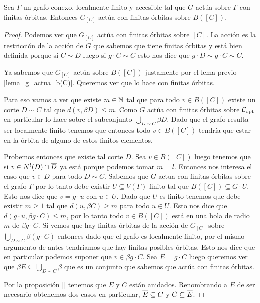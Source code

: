 \documentclass[tesis.tex]{subfiles}
\begin{document}
\begin{lema}
	Sea $\Gamma$ un grafo conexo, localmente finito y accesible tal que $G$ actúa sobre $\Gamma$ con finitas órbitas.
	Entonces $G_{[C]}$ actúa con finitas órbitas sobre $B([C])$.
\end{lema}
\begin{proof}
	Podemos ver que $G_{[C]}$ actúa con finitas órbitas sobre $[C]$.
	La acción es la restricción de la acción de $G$ que sabemos que tiene finitas órbitas y está bien definida porque si $C \sim D$ luego si $g \cdot C \sim C$ esto nos dice que $g \cdot D \sim g \cdot C \sim C$.
	
	Ya sabemos que $G_{[C]}$ actúa sobre $B([C])$ justamente por el lema previo \ref{lema_g_actua_b(C)}.
	Queremos ver que lo hace con finitas órbitas.
	
	Para eso vamos a ver que existe $m \in \mathbb{N}$ tal que para todo $v \in B([C])$ existe un corte $D \sim C$ tal que $d(v,\beta D) \le m$.
	Como $G$ actúa con finitas órbitas sobre ${\cal C}_{\text{opt}}$ en particular lo hace sobre el subconjunto $\bigcup_{D \sim C} \beta D$.
	Dado que el grafo resulta ser localmente finito tenemos que entonces todo $v \in B([C])$ tendría que estar en la órbita de alguno de estos finitos elementos.
	
	Probemos entonces que existe tal corte $D$.
	Sea $v \in B([C])$ luego tenemos que si $v \in N^l(D) \cap \overline D$ ya está porque podemos tomar $m=l$.
	Entonces nos interesa el caso que $v \in D$ para todo $D \sim C$.
	Sabemos que $G$ actua con finitas órbitas sobre el grafo $\Gamma$ por lo tanto debe existir $U \subseteq V(\Gamma)$ finito tal que $B([C]) \subseteq G \cdot U$.
	Esto nos dice que $v = g \cdot u$ con $u \in U$.
	Dado que $U$ es finito tenemos que debe existir $m \ge 1$ tal que $d(u,\beta C) \ge m$ para todo $u \in U$.
	Esto nos dice que $d(g \cdot u, \beta g \cdot C) \le m$, por lo tanto todo $v \in B([C])$ está en una bola de radio $m$ de $\beta g \cdot C$.
	Si vemos que hay finitas órbitas de la acción de $G_{[C]}$ sobre $\bigcup_{D \sim C} \beta (g \cdot C)$ entonces dado que el grafo es localmente finito, por el mismo argumento de antes tendríamos que hay finitas posibles órbitas.
	Esto nos dice que en particular podemos suponer que $v \in \beta g \cdot C$.
	Sea $E = g \cdot C$ luego queremos ver que $\beta E \subseteq \bigcup_{D \sim C} \beta $ que es un conjunto que sabemos que actúa con finitas órbitas.
	
	Por la proposición \ref{} tenemos que $E$ y $C$ están anidados.
	Renombrando a $E$ de ser necesario obtenemos dos casos en particular, $\overline E \subsetneq C$ y $C \subseteq \overline E$.
	

\end{proof}
\end{document}
